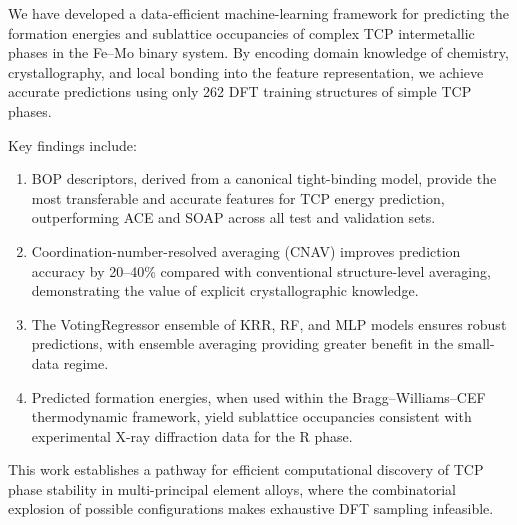 
We have developed a data-efficient machine-learning framework for predicting the formation energies and sublattice occupancies of complex TCP intermetallic phases in the Fe--Mo binary system. By encoding domain knowledge of chemistry, crystallography, and local bonding into the feature representation, we achieve accurate predictions using only 262 DFT training structures of simple TCP phases.

Key findings include:

\begin{enumerate}
  \item BOP descriptors, derived from a canonical tight-binding model, provide the most transferable and accurate features for TCP energy prediction, outperforming ACE and SOAP across all test and validation sets.
  \item Coordination-number-resolved averaging (CNAV) improves prediction accuracy by 20--40\% compared with conventional structure-level averaging, demonstrating the value of explicit crystallographic knowledge.
  \item The VotingRegressor ensemble of KRR, RF, and MLP models ensures robust predictions, with ensemble averaging providing greater benefit in the small-data regime.
  \item Predicted formation energies, when used within the Bragg--Williams--CEF thermodynamic framework, yield sublattice occupancies consistent with experimental X-ray diffraction data for the R phase.
\end{enumerate}

This work establishes a pathway for efficient computational discovery of TCP phase stability in multi-principal element alloys, where the combinatorial explosion of possible configurations makes exhaustive DFT sampling infeasible.
